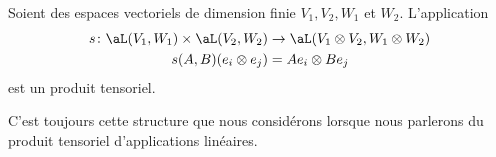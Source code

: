 \begin{proposition}   \label{PROPooLFHFooRmTAjY}
	Soient des espaces vectoriels de dimension finie \( V_1, V_2, W_1\) et \( W_2\). L'application
	\begin{equation}
		\begin{aligned}
			s\colon \aL(V_1,W_1)\times \aL(V_2,W_2) & \to \aL(V_1\otimes V_2,W_1\otimes W_2) \\
			s(A,B)(e_i\otimes e_j)                  & = Ae_i\otimes Be_j
		\end{aligned}
	\end{equation}
	est un produit tensoriel.

	C'est toujours cette structure que nous considérons lorsque nous parlerons du produit tensoriel d'applications linéaires.
\end{proposition}


